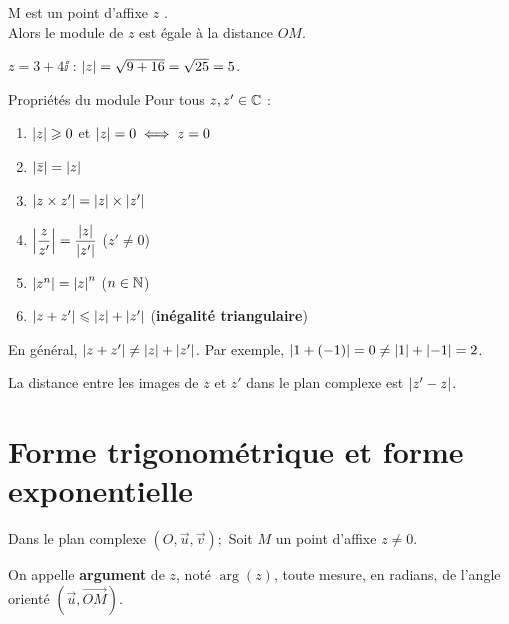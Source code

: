 M est un point d'affixe $z$ . \\
Alors le module de $z$ est égale à la distance $OM$.





\begin{exemple}
	$z = 3 + 4\ii$ : $\left|z\right| = \sqrt{9 + 16} = \sqrt{25} = 5$.
\end{exemple}

\begin{propriete}{Propriétés du module}{}
	Pour tous $z, z' \in \mathbb{C}$ :
	\begin{enumerate}
		\item $\left|z\right| \geqslant 0$ et $\left|z\right| = 0 \iff z = 0$
		\item $\left|\bar{z}\right| = \left|z\right|$
		\item $\left|z \times z'\right| = \left|z\right| \times \left|z'\right|$
		\item $\left|\dfrac{z}{z'}\right| = \dfrac{\left|z\right|}{\left|z'\right|}$ \quad ($z' \neq 0$)
		\item $\left|z^n\right| = \left|z\right|^n$ \quad ($n \in \mathbb{N}$)
		\item $\left|z + z'\right| \leqslant \left|z\right| + \left|z'\right|$ \quad (\textbf{inégalité triangulaire})
	\end{enumerate}
\end{propriete}

\begin{attention}
	En général, $\left|z + z'\right| \neq \left|z\right| + \left|z'\right|$.
	Par exemple, $\left|1 + (-1)\right| = 0 \neq \left|1\right| + \left|-1\right| = 2$.
\end{attention}

\interpretationgraphique
La distance entre les images de $z$ et $z'$ dans le plan complexe est $\left|z' - z\right|$.


\section{Forme trigonométrique et forme exponentielle}

\begin{definition}
	Dans le plan complexe $(O, \vec{u}, \vec{v});$
	Soit $M$ un point d'affixe $z\neq 0$.

	On appelle \textbf{argument} de $z$, noté $\arg(z)$, toute mesure, en radians, de l'angle orienté $\left(\vec{u},\overrightarrow{OM}\right)$.
\end{definition}

